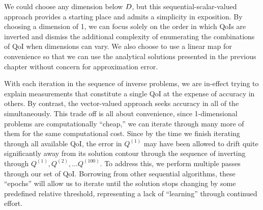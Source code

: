 We could choose any dimension below $D$, but this sequential-scalar-valued approach provides a starting place and admits a simplicity in exposition.
By choosing a dimension of 1, we can focus solely on the order in which QoIs are inverted and dismiss the additional complexity of enumerating the combinations of QoI when dimensions can vary.
We also choose to use a linear map for convenience so that we can use the analytical solutions presented in the previous chapter without concern for approximation error.

With each iteration in the sequence of inverse problems, we are in-effect trying to explain measurements that constitute a single QoI at the expense of accuracy in others.
By contrast, the vector-valued approach seeks accuracy in all of the simultaneously.
This trade off is all about convenience, since 1-dimensional problems are computationally ``cheap,'' we can iterate through many more of them for the same computational cost.
Since by the time we finish iterating through all available QoI, the error in $Q^{(1)}$ may have been allowed to drift quite significantly away from its solution contour through the sequence of inverting through $Q^{(1)}, Q^{(2)}, \dots Q^{(100)}$.
To address this, we perform multiple passes through our set of QoI.
Borrowing from other sequential algorithms, these ``epochs'' will allow us to iterate until the solution stops changing by some predefined relative threshold, representing a lack of ``learning'' through continued effort.

